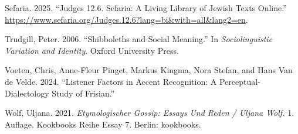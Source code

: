 \documentclass[
  letterpaper,
  DIV=11,
  numbers=noendperiod]{scrartcl}
\newlength{\cslhangindent}
\newenvironment{CSLReferences}[2] %
 {\begin{list}{}{%
  \setlength{\itemindent}{0pt}
  \setlength{\leftmargin}{0pt}
  \setlength{\parsep}{0pt}
  \ifodd #1
   \setlength{\leftmargin}{\cslhangindent}
   \setlength{\itemindent}{-1\cslhangindent}
  \fi
  \setlength{\itemsep}{#2\baselineskip}}}
 {\end{list}}
\begin{document}
\begin{CSLReferences}{1}{0}
Sefaria. 2025. {``Judges 12.6. {Sefaria}: A {Living} {Library} of
{Jewish} {Texts} {Online}.''}
\url{https://www.sefaria.org/Judges.12.6?lang=bi&with=all&lang2=en}.

Trudgill, Peter. 2006. {``Shibboleths and {Social} {Meaning}.''} In
\emph{Sociolinguistic {Variation} and {Identity}}. Oxford University
Press.

Voeten, Chris, Anne-Fleur Pinget, Markus Kingma, Nora Stefan, and Hans
Van de Velde. 2024. {``Listener Factors in Accent Recognition: {A}
Perceptual-Dialectology Study of {Frisian}.''}

Wolf, Uljana. 2021. \emph{Etymologischer {Gossip}: {Essays} Und {Reden}
/ {Uljana} {Wolf}.} 1. Auflage. Kookbooks {Reihe} {Essay} 7. Berlin:
kookbooks.

\end{CSLReferences}
\end{document}
